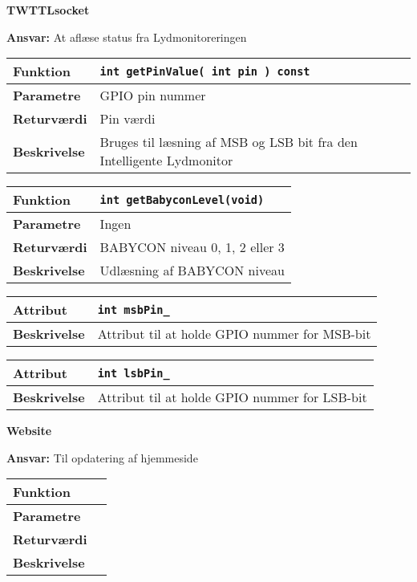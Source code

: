{\centering
\textbf{TWTTLsocket}\par
}
\textbf{Ansvar:} At aflæse status fra Lydmonitoreringen \

\begin{center}
    \begin{tabular}{ | l | p{} |}
    \hline
    \textbf{Funktion}	& \verb+int getPinValue( int pin ) const +\\ \hline
    \textbf{Parametre} 	& GPIO pin nummer\\ \hline
    \textbf{Returværdi}	& Pin værdi\\ \hline
    \textbf{Beskrivelse}	& Bruges til læsning af MSB og LSB bit fra den Intelligente Lydmonitor\\ \hline
    \end{tabular}
\end{center}

\begin{center}
    \begin{tabular}{ | l | p{} |}
    \hline
    \textbf{Funktion}	& \verb+int getBabyconLevel(void) +\\ \hline
    \textbf{Parametre} 	& Ingen\\ \hline
    \textbf{Returværdi}	& BABYCON niveau 0, 1, 2 eller 3\\ \hline
    \textbf{Beskrivelse}	& Udlæsning af BABYCON niveau\\ \hline
    \end{tabular}
\end{center}

\begin{center}
    \begin{tabular}{ | l | p{} |}
    \hline
    \textbf{Attribut}	& \verb+int msbPin_ + \\ \hline
    \textbf{Beskrivelse}	& Attribut til at holde GPIO nummer for MSB-bit\\ \hline
    \end{tabular}
\end{center}

\begin{center}
    \begin{tabular}{ | l | p{} |}
    \hline
    \textbf{Attribut}	& \verb+int lsbPin_ +\\ \hline
    \textbf{Beskrivelse}	& Attribut til at holde GPIO nummer for LSB-bit\\ \hline
    \end{tabular}
\end{center}

{\centering
\textbf{Website}\par
}
\textbf{Ansvar:} Til opdatering af hjemmeside \

\begin{center}
    \begin{tabular}{ | l | p{} |}
    \hline
    \textbf{Funktion}	& \\ \hline
    \textbf{Parametre} 	& \\ \hline
    \textbf{Returværdi}	& \\ \hline
    \textbf{Beskrivelse}	& \\ \hline
    \end{tabular}
\end{center}